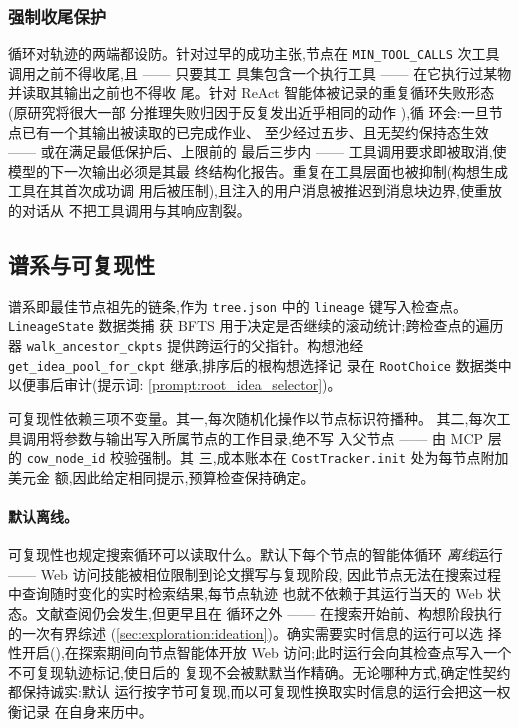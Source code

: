 \subsubsection*{强制收尾保护}

循环对轨迹的两端都设防。针对过早的成功主张,节点在
\texttt{MIN\_TOOL\_CALLS} 次工具调用之前不得收尾,且 —— 只要其工
具集包含一个执行工具 —— 在它执行过某物并读取其输出之前也不得收
尾。针对 ReAct 智能体被记录的重复循环失败形态(原研究将很大一部
分推理失败归因于反复发出近乎相同的动作 \cite{yao2023react}),循
环会:一旦节点已有一个其输出被读取的已完成作业、
至少经过五步、且无契约保持态生效 —— 或在满足最低保护后、上限前的
最后三步内 —— 工具调用要求即被取消,使模型的下一次输出必须是其最
终结构化报告。重复在工具层面也被抑制(构想生成工具在其首次成功调
用后被压制),且注入的用户消息被推迟到消息块边界,使重放的对话从
不把工具调用与其响应割裂。

\subsection{谱系与可复现性}\label{sec:exploration:lineage}

谱系即最佳节点祖先的链条,作为 \texttt{tree.json} 中的
\texttt{lineage} 键写入检查点。\texttt{LineageState} 数据类捕
获 BFTS 用于决定是否继续的滚动统计;跨检查点的遍历器
\texttt{walk\_ancestor\_ckpts} 提供跨运行的父指针。构想池经
\texttt{get\_idea\_pool\_for\_ckpt} 继承,排序后的根构想选择记
录在 \texttt{RootChoice} 数据类中以便事后审计(提示词:
\cref{prompt:root_idea_selector})。

可复现性依赖三项不变量。其一,每次随机化操作以节点标识符播种。
其二,每次工具调用将参数与输出写入所属节点的工作目录,绝不写
入父节点 —— 由 MCP 层的 \texttt{cow\_node\_id} 校验强制。其
三,成本账本在 \texttt{CostTracker.init} 处为每节点附加美元金
额,因此给定相同提示,预算检查保持确定。

\paragraph{默认离线。}
可复现性也规定搜索循环可以读取什么。默认下每个节点的智能体循环
\emph{离线}运行 —— Web 访问技能被相位限制到论文撰写与复现阶段,
因此节点无法在搜索过程中查询随时变化的实时检索结果,每节点轨迹
也就不依赖于其运行当天的 Web 状态。文献查阅仍会发生,但更早且在
循环之外 —— 在搜索开始前、构想阶段执行的一次有界综述
(\cref{sec:exploration:ideation})。确实需要实时信息的运行可以选
择性开启(),在探索期间向节点智能体开放
Web 访问;此时运行会向其检查点写入一个不可复现轨迹标记,使日后的
复现不会被默默当作精确。无论哪种方式,确定性契约都保持诚实:默认
运行按字节可复现,而以可复现性换取实时信息的运行会把这一权衡记录
在自身来历中。

